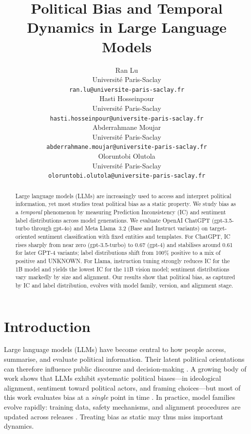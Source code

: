 \documentclass[11pt]{article}
\title{Political Bias and Temporal Dynamics in Large Language Models}
\author{Ran Lu \\
  Université Paris-Saclay \\
  \texttt{ran.lu@universite-paris-saclay.fr} \\\And
  Hasti Hosseinpour \\
  Université Paris-Saclay \\
  \texttt{hasti.hosseinpour@universite-paris-saclay.fr} \\\And
  Abderrahmane Moujar \\
  Université Paris-Saclay \\
  \texttt{abderrahmane.moujar@universite-paris-saclay.fr} \\\And
  Oloruntobi Olutola \\
  Université Paris-Saclay \\
  \texttt{oloruntobi.olutola@universite-paris-saclay.fr}}
\begin{document}
\maketitle

\begin{abstract}
Large language models (LLMs) are increasingly used to access and interpret political information, yet most studies treat political bias as a static property. We study bias as a \emph{temporal} phenomenon by measuring Prediction Inconsistency (IC) and sentiment label distributions across model generations. We evaluate OpenAI ChatGPT (gpt-3.5-turbo through gpt-4o) and Meta Llama~3.2 (Base and Instruct variants) on target-oriented sentiment classification with fixed entities and templates. For ChatGPT, IC rises sharply from near zero (gpt-3.5-turbo) to 0.67 (gpt-4) and stabilises around 0.61 for later GPT-4 variants; label distributions shift from 100\% positive to a mix of positive and UNKNOWN. For Llama, instruction tuning strongly reduces IC for the 1B model and yields the lowest IC for the 11B vision model; sentiment distributions vary markedly by size and alignment. Our results show that political bias, as captured by IC and label distribution, evolves with model family, version, and alignment stage.
\end{abstract}

\section{Introduction}

Large language models (LLMs) have become central to how people access, summarise, and evaluate political information. Their latent political orientations can therefore influence public discourse and decision-making \citep{santurkar2023,buyl2026,hartmann2023,bang2024}. A growing body of work shows that LLMs exhibit systematic political biases---in ideological alignment, sentiment toward political actors, and framing choices---but most of this work evaluates bias at a \emph{single} point in time \citep{hartmann2023,bang2024}. In practice, model families evolve rapidly: training data, safety mechanisms, and alignment procedures are updated across releases \citep{touvron2023,dubey2024}. Treating bias as static may thus miss important dynamics.
\end{document}
